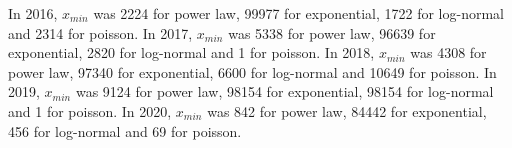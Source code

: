 \documentclass[preprint,12pt]{elsarticle}
\begin{document}
\begin{table}[H]
\centering
\caption{Likelihood ratio tests for comparing out degree distribution (2009-2015)}
\label{outdeg}
\end{table}

In 2016, $x_{min}$ was 2224 for power law, 99977 for exponential, 1722 for log-normal and 2314 for poisson. In 2017, $x_{min}$ was 5338 for power law, 96639 for exponential, 2820 for log-normal and 1 for poisson. In 2018, $x_{min}$ was 4308 for power law, 97340 for exponential, 6600 for log-normal and 10649 for poisson. In 2019, $x_{min}$ was 9124 for power law, 98154 for exponential, 98154 for log-normal and 1 for poisson. In 2020, $x_{min}$ was 842 for power law, 84442 for exponential, 456 for log-normal and 69 for poisson.
\end{document}
